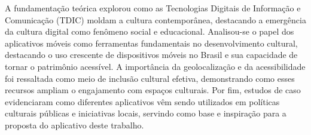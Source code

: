 A fundamentação teórica explorou como as Tecnologias Digitais de Informação e Comunicação (TDIC) moldam a cultura contemporânea, destacando a emergência da cultura digital como fenômeno social e educacional. Analisou-se o papel dos aplicativos móveis como ferramentas fundamentais no desenvolvimento cultural, destacando o uso crescente de dispositivos móveis no Brasil e sua capacidade de tornar o patrimônio acessível. A importância da geolocalização e da acessibilidade foi ressaltada como meio de inclusão cultural efetiva, demonstrando como esses recursos ampliam o engajamento com espaços culturais. Por fim, estudos de caso evidenciaram como diferentes aplicativos vêm sendo utilizados em políticas culturais públicas e iniciativas locais, servindo como base e inspiração para a proposta do aplicativo deste trabalho.
